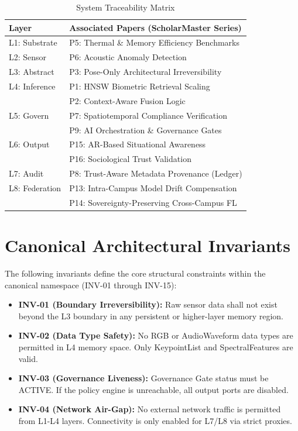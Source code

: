 \documentclass[conference]{IEEEtran}
\begin{document}
\begin{table}[h]
\caption{System Traceability Matrix}
\centering
\begin{tabular}{p{1.5cm} p{6.5cm}}
\toprule
\textbf{Layer} & \textbf{Associated Papers (ScholarMaster Series)} \\
\midrule
L1: Substrate & P5: Thermal \& Memory Efficiency Benchmarks \\
\midrule
L2: Sensor    & P6: Acoustic Anomaly Detection \\
\midrule
L3: Abstract  & P3: Pose-Only Architectural Irreversibility \\
\midrule
L4: Inference & P1: HNSW Biometric Retrieval Scaling \\
              & P2: Context-Aware Fusion Logic \\
\midrule
L5: Govern    & P7: Spatiotemporal Compliance Verification \\
              & P9: AI Orchestration \& Governance Gates \\
\midrule
L6: Output    & P15: AR-Based Situational Awareness \\
              & P16: Sociological Trust Validation \\
\midrule
L7: Audit     & P8: Trust-Aware Metadata Provenance (Ledger) \\
\midrule
L8: Federation & P13: Intra-Campus Model Drift Compensation \\
               & P14: Sovereignty-Preserving Cross-Campus FL \\
\bottomrule
\end{tabular}
\label{tab:trace}
\end{table}

\section{Canonical Architectural Invariants}
The following invariants define the core structural constraints within the canonical namespace (INV-01 through INV-15):
\begin{itemize}
    \item \textbf{INV-01 (Boundary Irreversibility):} Raw sensor data shall not exist beyond the L3 boundary in any persistent or higher-layer memory region.
    \item \textbf{INV-02 (Data Type Safety):} No RGB or AudioWaveform data types are permitted in L4 memory space. Only KeypointList and SpectralFeatures are valid.
    \item \textbf{INV-03 (Governance Liveness):} Governance Gate status must be ACTIVE. If the policy engine is unreachable, all output ports are disabled.
    \item \textbf{INV-04 (Network Air-Gap):} No external network traffic is permitted from L1-L4 layers. Connectivity is only enabled for L7/L8 via strict proxies.
\end{itemize}
\end{document}
